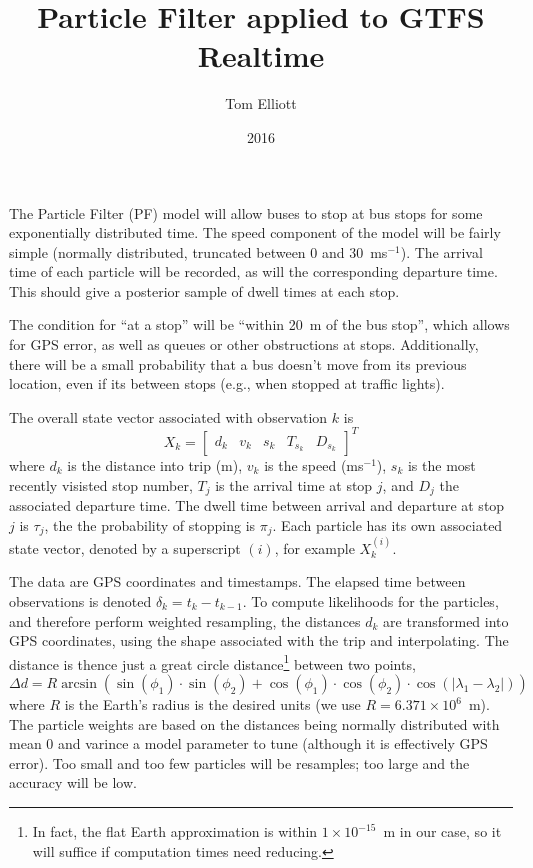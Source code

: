 \documentclass[10pt,a4paper]{article}
\title{Particle Filter applied to GTFS Realtime}
\author{Tom Elliott}
\date{2016}
\begin{document}
\maketitle


The Particle Filter (PF) model will allow buses to stop at bus stops
for some exponentially distributed time.
The speed component of the model will be fairly simple
(normally distributed, truncated between 0 and 30~ms$^{-1}$).
The arrival time of each particle will be recorded, 
as will the corresponding departure time. 
This should give a posterior sample of dwell times at each stop.


The condition for ``at a stop'' will be ``within 20~m of the bus stop'',
which allows for GPS error, as well as queues or other obstructions at stops.
Additionally, there will be a small probability that a bus doesn't move from its
previous location, even if its between stops (e.g., when stopped at traffic lights).



The overall state vector associated with observation $k$ is
\begin{equation}
  \label{eq:state_vector}
  X_k =
  \begin{bmatrix}
    d_k & v_k & s_k & T_{s_k} & D_{s_k}
  \end{bmatrix}^T
\end{equation}
where $d_k$ is the distance into trip (m),
$v_k$ is the speed (ms$^{-1}$),
$s_k$ is the most recently visisted stop number,
$T_j$ is the arrival time at stop $j$,
and $D_j$ the associated departure time.
The dwell time between arrival and departure at stop $j$ is $\tau_j$,
the the probability of stopping is $\pi_j$.
Each particle has its own associated state vector, denoted by a superscript $(i)$,
for example $X_k^{(i)}$.

The data are GPS coordinates and timestamps.
The elapsed time between observations is denoted $\delta_k = t_k - t_{k-1}$.
To compute likelihoods for the particles, and therefore perform weighted resampling,
the distances $d_k$ are transformed into GPS coordinates, using the shape associated
with the trip and interpolating.
The distance is thence just a great circle distance\footnote{In fact, 
the flat Earth approximation is within $1\times 10^{-15}$~m in our case, 
so it will suffice if computation times need reducing.}
between two points,
\begin{equation}
  \label{eq:greatcircle}
  \Delta d = R \arcsin(\sin(\phi_1) \cdot \sin(\phi_2) +
  \cos(\phi_1) \cdot \cos(\phi_2) \cdot \cos(|\lambda_1 - \lambda_2|))
\end{equation}
where $R$ is the Earth's radius is the desired units (we use $R = 6.371\times 10^6$~m).
The particle weights are based on the distances being normally distributed
with mean 0 and varince a model parameter to tune (although it is effectively GPS error).
Too small and too few particles will be resamples; too large and the accuracy will be low.
\end{document}
